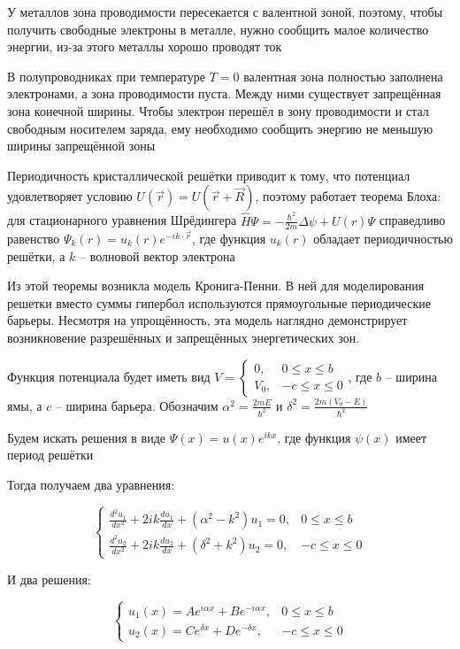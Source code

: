 \documentclass[12pt]{article}
\begin{document}
У металлов зона проводимости пересекается с валентной зоной, поэтому, чтобы получить свободные электроны в металле, нужно сообщить малое количество энергии, из-за этого металлы хорошо проводят ток

В полупроводниках при температуре $T=0$ валентная зона полностью заполнена электронами, а зона проводимости пуста. Между ними существует запрещённая зона конечной ширины. Чтобы электрон перешёл в зону проводимости и стал свободным носителем заряда, ему необходимо сообщить энергию не меньшую ширины запрещённой зоны

\mediumvspace

Периодичность кристаллической решётки приводит к тому, что потенциал удовлетворяет условию $U(\vec r) = U(\vec r + \vec R)$, поэтому работает теорема Блоха: для стационарного уравнения Шрёдингера $\hat H \Psi = -\frac{\hbar^2}{2m} \Delta \psi + U(r) \Psi$ справедливо равенство $\Psi_{k}(r) = u_{k}(r) e^{-i k \cdot \vec r}$, где функция $u_{k}(r)$ обладает периодичностью решётки, а $k$ -- волновой вектор электрона

Из этой теоремы возникла модель Кронига-Пенни. В ней для моделирования решетки вместо суммы гипербол используются прямоугольные периодические барьеры. Несмотря на упрощённость, эта модель наглядно демонстрирует возникновение разрешённых и запрещённых энергетических зон.

Функция потенциала будет иметь вид $V = \begin{cases}0, & 0 \leq x \leq b \\ V_0, & -c \leq x \leq 0\end{cases}$, где $b$ -- ширина ямы, а $c$ -- ширина барьера. Обозначим $\alpha^2 = \frac{2 m E}{\hbar^2}$ и $\delta^2 = \frac{2 m (V_0 - E)}{\hbar^2}$

Будем искать решения в виде $\Psi(x) = u(x) e^{ikx}$, где функция $\psi(x)$ имеет период решётки

Тогда получаем два уравнения: 

\[\begin{cases}\frac{d^2 u_1}{dx^2} + 2ik \frac{d u_1}{dx} + (\alpha^2 - k^2) u_1 = 0, & 0 \leq x \leq b \\ \frac{d^2 u_2}{dx^2} + 2ik \frac{d u_2}{dx} + (\delta^2 + k^2) u_2 = 0, & -c \leq x \leq 0\end{cases}\]

И два решения:

\[\begin{cases}u_1(x) = A e^{i \alpha x} + B e^{- i \alpha x}, & 0 \leq x \leq b \\ u_2(x) = C e^{\delta x} + D e^{- \delta x}, & -c \leq x \leq 0\end{cases}\]
\end{document}
